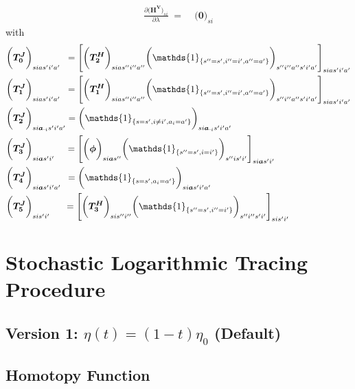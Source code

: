 \documentclass[11pt,fleqn]{article}
\newcommand{\bzero}{\bm{0}}
\newcommand{\ba}{\bm{a}}
\newcommand{\id}{\mathds{1}}
\newcommand{\shortminus}{{\text{\scalebox{0.4}[1.0]{\(-\)}}}}
\newcommand{\minusi}{\shortminus i}
\begin{document}
\begin{align*}
	\frac{ \partial \biggl( \bm{H^{V}} \biggr)_{si} }{ \partial \lambda } \;=\; &
		\biggl( \bzero \biggr)_{si}
\end{align*}
with
\begin{align*}
	& \biggl( \bm{T_0^J} \biggr)_{sias'i'a'} \;\; = 
		\Biggl[ \biggl( \bm{T_2^H}\biggr)_{sias''i''a''} \biggl( \id_{\{s''=s',i''=i',a''=a'\}} \biggr)_{s''i''a''s'i'a'} \Biggr]_{sias'i'a'} \\
	& \biggl( \bm{T_1^J} \biggr)_{sias'i'a'} \;\; = 
		\Biggl[ \biggl( \bm{T_1^H}\biggr)_{sias''i''a''} \biggl( \id_{\{s''=s',i''=i',a''=a'\}} \biggr)_{s''i''a''s'i'a'} \Biggr]_{sias'i'a'} \\
	& \biggl( \bm{T_2^J}\biggr)_{si\ba_{\minusi}s'i'a'} = 
		\biggl( \id_{\{s=s',i\neq i',a_{i}=a'\}} \biggr)_{si\ba_{\minusi}s'i'a'} \\
	& \biggl( \bm{T_3^J} \biggr)_{si\ba s'i'} \quad\, =
		\Biggl[ \biggl( \bm{\phi} \biggr)_{si\ba s''}\biggl( \id_{\{s''=s',i=i'\}} \biggr)_{s''is'i'} \Biggr]_{si\ba s'i'} \\
	& \biggl( \bm{T_4^J}\biggr)_{si\ba s'i'a'} \;\: =
		\biggl( \id_{\{s=s',a_{i}=a'\}} \biggr)_{si\ba s'i'a'} \\
	& \biggl( \bm{T_5^J}\biggr)_{sis'i'} \quad\;\; = 
		\Biggl[ \biggl( \bm{T_3^H} \biggr)_{sis''i''} \biggl( \id_{\{s''=s',i''=i'\}} \biggr)_{s''i''s'i'} \Biggr]_{sis'i'}
\end{align*}






\newpage
\section{Stochastic Logarithmic Tracing Procedure}


\subsection{Version 1: $\eta(t) = (1-t)\eta_0$ (Default)}


\subsection*{Homotopy Function}
\end{document}
